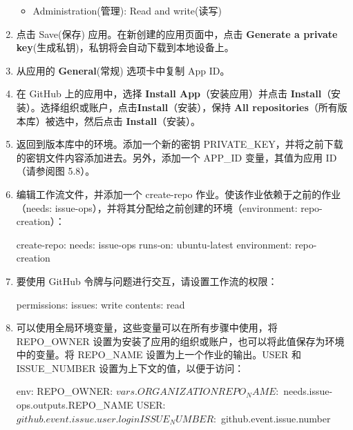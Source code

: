 \begin{enumerate}
\begin{itemize}
\item 
Administration(管理): Read and write(读写)
\end{itemize}

\item 
点击 Save(保存) 应用。在新创建的应用页面中，点击 \textbf{Generate a private key}(生成私钥)，私钥将会自动下载到本地设备上。

\item 
从应用的 \textbf{General}(常规) 选项卡中复制 App ID。

\item 
在 GitHub 上的应用中，选择 \textbf{Install App}（安装应用）并点击 \textbf{Install}（安装）。选择组织或账户，点击\textbf{Install}（安装），保持 \textbf{All repositories}（所有版本库）被选中，然后点击 \textbf{Install}（安装）。

\item 
返回到版本库中的环境。添加一个新的密钥 PRIVATE\_KEY，并将之前下载的密钥文件内容添加进去。另外，添加一个 APP\_ID 变量，其值为应用 ID（请参阅图 5.8）。


\item 
编辑工作流文件，并添加一个 create-repo 作业。使该作业依赖于之前的作业（needs: issue-ops），并将其分配给之前创建的环境（environment: repo-creation）：

\begin{shell}
create-repo:
  needs: issue-ops
  runs-on: ubuntu-latest
  environment: repo-creation
\end{shell}

\item 
要使用 GitHub 令牌与问题进行交互，请设置工作流的权限：

\begin{shell}
  permissions:
    issues: write
    contents: read
\end{shell}

\item 
可以使用全局环境变量，这些变量可以在所有步骤中使用，将 REPO\_OWNER 设置为安装了应用的组织或账户，也可以将此值保存为环境中的变量。将 REPO\_NAME 设置为上一个作业的输出。USER 和 ISSUE\_NUMBER 设置为上下文的值，以便于访问：

\begin{shell}
env:
  REPO_OWNER: ${{ vars.ORGANIZATION }}
  REPO_NAME: ${{ needs.issue-ops.outputs.REPO_NAME }}
  USER: ${{ github.event.issue.user.login }}
  ISSUE_NUMBER: ${{ github.event.issue.number }}
\end{shell}


\end{enumerate}
